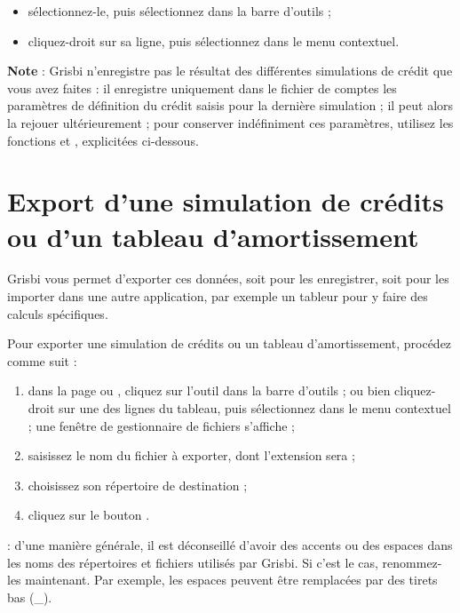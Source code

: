 \begin{itemize}
	 \item sélectionnez-le, puis sélectionnez  dans la barre d'outils ; 
	 \item cliquez-droit sur sa ligne, puis sélectionnez  dans le menu contextuel.
\end{itemize}

\textbf{Note} : Grisbi n'enregistre pas le résultat des différentes simulations de crédit que vous avez faites : il enregistre uniquement dans le fichier de comptes les paramètres de définition du crédit saisis pour la dernière simulation ; il peut alors la rejouer ultérieurement ; pour conserver indéfiniment ces paramètres, utilisez les fonctions  et , explicitées ci-dessous.


\section{Export d'une simulation de crédits ou d'un tableau d'amortissement\label{credit-export}}


Grisbi vous permet d'exporter ces données, soit pour les enregistrer, soit pour les importer dans une autre application, par exemple un tableur pour y faire des calculs spécifiques.

Pour exporter une simulation de crédits ou un tableau d'amortissement, procédez comme suit :

\begin{enumerate}
	 \item dans la page  ou , cliquez sur l'outil  dans la barre d'outils ; ou bien cliquez-droit sur une des lignes du tableau, puis sélectionnez  dans le menu contextuel ; une fenêtre de gestionnaire de fichiers s'affiche ;
	 \item saisissez le nom du fichier à exporter, dont l'extension sera  ;
	 \item choisissez son répertoire de destination ;
	 \item cliquez sur le bouton .
\end{enumerate}

 : d'une manière générale, il est déconseillé d'avoir des accents ou des espaces dans les noms des répertoires et fichiers utilisés par Grisbi. Si c'est le cas, renommez-les maintenant. Par exemple, les espaces peuvent être remplacées par des tirets bas (\_).


